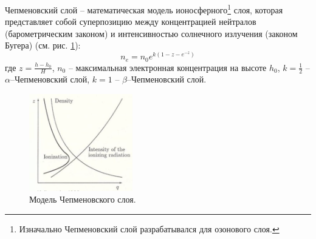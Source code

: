 Чепменовский слой -- математическая модель ионосферного\footnote{Изначально Чепменовский слой разрабатывался для озонового слоя.} слоя, которая представляет собой суперпозицию между концентрацией нейтралов (барометрическим законом) и интенсивностью солнечного излучения (законом Бугера) (см. рис. \ref{fig:chap}):
\begin{equation}
n_e=n_0 e^{k\left(1-z-e^{-z}\right)}
\end{equation}
где $z=\frac{h-h_0}{H}$, $n_0$ -- максимальная электронная концентрация на высоте $h_0$, $k=\frac{1}{2}$ -- $\alpha$--Чепменовский слой, $k=1$ -- $\beta$--Чепменовский слой.

\begin{figure}[!ht]
\centering
\includegraphics[width=0.4\textwidth]{images/chap.png}
\caption{Модель Чепменовского слоя.}\label{fig:chap}
\end{figure}
